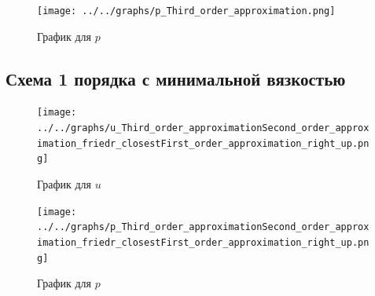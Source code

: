 \documentclass[a4paper, 12pt]{article} %
\begin{document}
\begin{figure}[h!]
    \centering
    \texttt{[image: ../../graphs/p\_Third\_order\_approximation.png]}
    \caption{График для $p$ \\ }
    \label{fig:vac}
\end{figure}

\newpage
\subsection{Схема 1 порядка с минимальной вязкостью}

\begin{figure}[h!]
    \centering
    \texttt{[image: ../../graphs/u\_Third\_order\_approximationSecond\_order\_approximation\_friedr\_closestFirst\_order\_approximation\_right\_up.png]}
    \caption{График для $u$ \\ }
    \label{fig:vac}
\end{figure}

\begin{figure}[h!]
    \centering
    \texttt{[image: ../../graphs/p\_Third\_order\_approximationSecond\_order\_approximation\_friedr\_closestFirst\_order\_approximation\_right\_up.png]}
    \caption{График для $p$ \\ }
    \label{fig:vac}
\end{figure}
\end{document}
